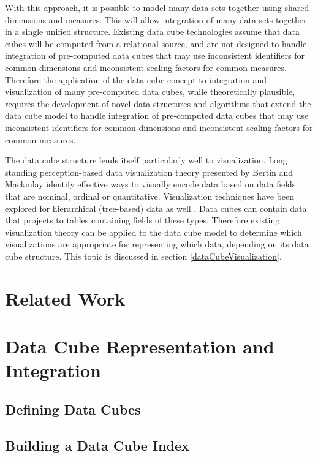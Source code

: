 \documentclass[12pt]{article}
\begin{document}
\begin{doublespace}
With this approach, it is possible to model many data sets together using shared dimensions and measures. This will allow integration of many data sets together in a single unified structure. Existing data cube technologies assume that data cubes will be computed from a relational source, and are not designed to handle integration of pre-computed data cubes that may use inconsistent identifiers for common dimensions and inconsistent scaling factors for common measures. Therefore the application of the data cube concept to integration and visualization of many pre-computed data cubes, while theoretically plausible, requires the development of novel data structures and algorithms that extend the data cube model to handle integration of pre-computed data cubes that may use inconsistent identifiers for common dimensions and inconsistent scaling factors for common measures.


The data cube structure lends itself particularly well to visualization. Long standing perception-based data visualization theory presented by Bertin \cite{bertin1983semiology} and Mackinlay \cite{mackinlay1986automating} identify effective ways to visually encode data based on data fields that are nominal, ordinal or quantitative. Visualization techniques have been explored for hierarchical (tree-based) data as well \cite{graham2010survey}. Data cubes can contain data that projects to tables containing fields of these types. Therefore existing visualization theory can be applied to the data cube model to determine which visualizations are appropriate for representing which data, depending on its data cube structure. This topic is discussed in section \ref{dataCubeVisualization}.

\pagebreak
\section{Related Work}

\pagebreak
\section{Data Cube Representation and Integration}
\subsection{Defining Data Cubes}
\subsection{Building a Data Cube Index}

\end{doublespace}
\end{document}
